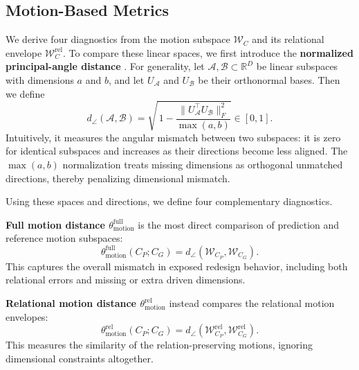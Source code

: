 \subsection{Motion-Based Metrics}
\label{sec:motion_metrics}

We derive four diagnostics from the motion subspace $\mathcal{W}_C$ and its relational envelope $\mathcal{W}_C^\mathrm{rel}$. To compare these linear spaces, we first introduce the \textbf{normalized principal-angle distance} \cite{ye2016schubert}.
For generality, let $\mathcal{A},\mathcal{B}\subset\mathbb{R}^{D}$ be linear subspaces with dimensions $a$ and $b$, and let $U_\mathcal{A}$ and $U_\mathcal{B}$ be their orthonormal bases. Then we define
\begin{equation}
    d_\angle(\mathcal{A},\mathcal{B})
    =
    \sqrt{\,1 - \frac{\lVert U_\mathcal{A}^\top U_\mathcal{B}\rVert_F^2}{\max(a,b)}}
    \in[0,1].
    \label{eq:principal_angle}
\end{equation}
Intuitively, it measures the angular mismatch between two subspaces: it is zero for identical subspaces and increases as their directions become less aligned. The $\max(a,b)$ normalization treats missing dimensions as orthogonal unmatched directions, thereby penalizing dimensional mismatch.

Using these spaces and directions, we define four complementary diagnostics.

\noindent\textbf{Full motion distance $\theta_{\mathrm{motion}}^{\mathrm{full}}$}
is the most direct comparison of prediction and reference motion subspaces:
\begin{equation}
    \theta_\mathrm{motion}^\mathrm{full}(C_P;C_G)
    =
    d_\angle(\mathcal{W}_{C_P},\mathcal{W}_{C_G}).
    \label{eq:full_motion_distance}
\end{equation}
This captures the overall mismatch in exposed redesign behavior, including both
relational errors and missing or extra driven dimensions.

\noindent\textbf{Relational motion distance $\theta_\mathrm{motion}^\mathrm{rel}$}
instead compares the relational motion envelopes:
\begin{equation}
    \theta_\mathrm{motion}^\mathrm{rel}(C_P;C_G)
    =
    d_\angle(\mathcal{W}^\mathrm{rel}_{C_P},
             \mathcal{W}^\mathrm{rel}_{C_G}).
    \label{eq:rel_motion_distance}
\end{equation}
This measures the similarity of the relation-preserving motions, ignoring dimensional constraints altogether.

